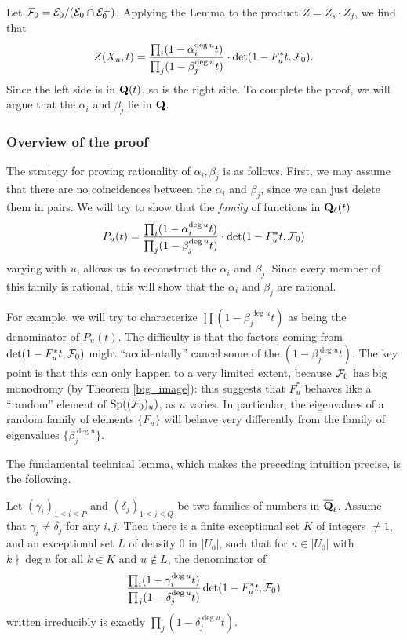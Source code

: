 Let $\mathcal{F}_0 = \mathcal{E}_0/(\mathcal{E}_0 \cap \mathcal{E}_0^{\perp})$. Applying the Lemma to the product $Z = Z_s \cdot Z_f$, we find that 
\[
Z(X_u, t) = \frac{\prod_i (1-\alpha_i^{\deg u} t)}{\prod_j (1-\beta_j^{\deg u} t) } \cdot \det (1-F_u^* t, \mathcal{F}_0).
\]
Since the left side is in $\mathbf{Q}(t)$, so is the right side. To complete the proof, we will argue that the $\alpha_i$ and $\beta_j$ lie in $\mathbf{Q}$. 

\subsubsection{Overview of the proof}
The strategy for proving rationality of $\alpha_i, \beta_j$ is as follows. First, we may assume that there are no coincidences between the $\alpha_i$ and $\beta_j$, since we can just delete them in pairs. We will try to show that the \emph{family} of functions in $\mathbf{Q}_{\ell}(t)$ 
\[
P_u(t) = \frac{\prod_i (1-\alpha_i^{\deg u} t)}{\prod_j (1-\beta_j^{\deg u} t) } \cdot \det (1-F_u^* t, \mathcal{F}_0)
\]
varying with $u$, allows us to reconstruct the $\alpha_i$ and $\beta_j$. Since every member of this family is rational, this will show that the $\alpha_i$ and $\beta_j$ are rational. 

For example, we will try to characterize $ \prod (1-\beta_j^{\deg u} t)$ as being the denominator of $P_u(t)$. The difficulty is that the factors coming from $\det (1-F_u^* t, \mathcal{F}_0)$ might ``accidentally'' cancel some of the $(1-\beta_j^{\deg u} t)$. The key point is that this can only happen to a very limited extent, because $\mathcal{F}_0$ has big monodromy (by Theorem \ref{big_image}): this suggests that $F_u^*$ behaves like a ``random'' element of $\operatorname{Sp}((\mathcal{F}_0)_u)$, as $u$ varies. In particular, the eigenvalues of a random family of elements $\{F_u\}$ will behave very differently from the family of eigenvalues $\{\beta_j^{\deg u}\}$. 

The fundamental technical lemma, which makes the preceding intuition precise, is the following. 

\begin{prop}\label{tech_lemma}
Let $(\gamma_i)_{1 \leq i \leq P}$ and $(\delta_j)_{1 \leq j \leq Q}$ be two families of numbers in $\overline{\mathbf{Q}}_{\ell}$. Assume that $\gamma_i \neq \delta_j$ for any $i,j$. Then there is a finite exceptional set $K$ of integers $\neq 1$, and an exceptional set $L$ of density $0$ in $|U_0|$, such that for $u \in |U_0|$ with $k \nmid \deg u$ for all $k \in K$ and $u \notin L$, the denominator of 
\[
\frac{\prod_i (1-\gamma_i^{\deg u} t)}{\prod_j (1-\delta_j^{\deg u} t) } \det (1-F_u^* t, \mathcal{F}_0) 
\]
written irreducibly is exactly $\prod_j (1-\delta_j^{\deg u} t)$. 
\end{prop} 


